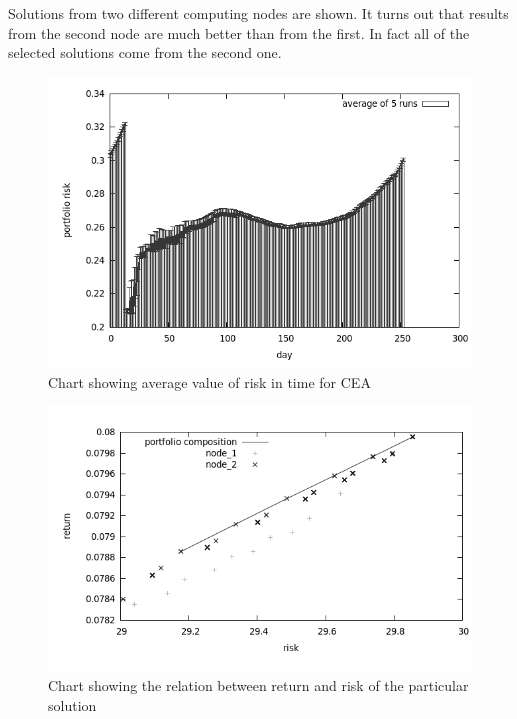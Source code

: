 Solutions from two different computing nodes are shown.
It turns out that results from the second node are much better than from the first.
In fact all of the selected solutions come from the second one.

\begin{figure}[ht]
  \begin{center}
    \includegraphics[scale=.3]{cea_ave_risk_2010.png}
  \end{center}
  \caption{Chart showing average value of risk in time for CEA}
  \label{fig:co_eval_risk}
\end{figure}

\begin{figure}[ht]
  \begin{center}
    \includegraphics[scale=.3]{pareto_co_evol.png}
  \end{center}
  \caption{Chart showing the relation between return and risk of the particular solution}
  \label{fig:pareto_co_evol}
\end{figure}


